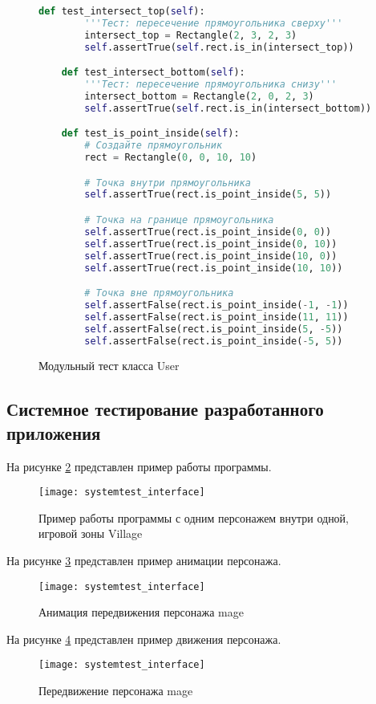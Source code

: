 \begin{figure}[ht]
\begin{lstlisting}[language=Python]
	def test_intersect_top(self):
		'''Тест: пересечение прямоугольника сверху'''
		intersect_top = Rectangle(2, 3, 2, 3)
		self.assertTrue(self.rect.is_in(intersect_top))

	def test_intersect_bottom(self):
		'''Тест: пересечение прямоугольника снизу'''
		intersect_bottom = Rectangle(2, 0, 2, 3)
		self.assertTrue(self.rect.is_in(intersect_bottom))

	def test_is_point_inside(self):
		# Создайте прямоугольник
		rect = Rectangle(0, 0, 10, 10)

		# Точка внутри прямоугольника
		self.assertTrue(rect.is_point_inside(5, 5))

		# Точка на границе прямоугольника
		self.assertTrue(rect.is_point_inside(0, 0))
		self.assertTrue(rect.is_point_inside(0, 10))
		self.assertTrue(rect.is_point_inside(10, 0))
		self.assertTrue(rect.is_point_inside(10, 10))

		# Точка вне прямоугольника
		self.assertFalse(rect.is_point_inside(-1, -1))
		self.assertFalse(rect.is_point_inside(11, 11))
		self.assertFalse(rect.is_point_inside(5, -5))
		self.assertFalse(rect.is_point_inside(-5, 5))
\end{lstlisting}  
\caption{Модульный тест класса User}
\label{unitUser:image}
\end{figure}

\subsection{Системное тестирование разработанного приложения}

На рисунке \ref{systemtest_interface:image} представлен пример работы программы.
\begin{figure}[H]
	\centering
	\texttt{[image: systemtest\_interface]}
	\caption{Пример работы программы с одним персонажем внутри одной, игровой зоны Village}
	\label{systemtest_interface:image}
\end{figure}

На рисунке \ref{systemtest_interface1:image} представлен пример анимации персонажа.
\begin{figure}[H]
	\centering
	\texttt{[image: systemtest\_interface]}
	\caption{Анимация передвижения персонажа mage}
	\label{systemtest_interface1:image}
\end{figure}

На рисунке \ref{systemtest_interface2:image} представлен пример движения персонажа.
\begin{figure}[H]
	\centering
	\texttt{[image: systemtest\_interface]}
	\caption{Передвижение персонажа mage}
	\label{systemtest_interface2:image}
\end{figure}

